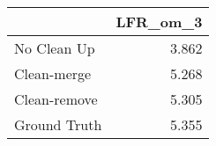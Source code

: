 \begin{tabular}{lr}
\toprule
{} & LFR_om_3 \\
\midrule
No Clean Up  &    3.862 \\
Clean-merge  &    5.268 \\
Clean-remove &    5.305 \\
Ground Truth &    5.355 \\
\bottomrule
\end{tabular}

